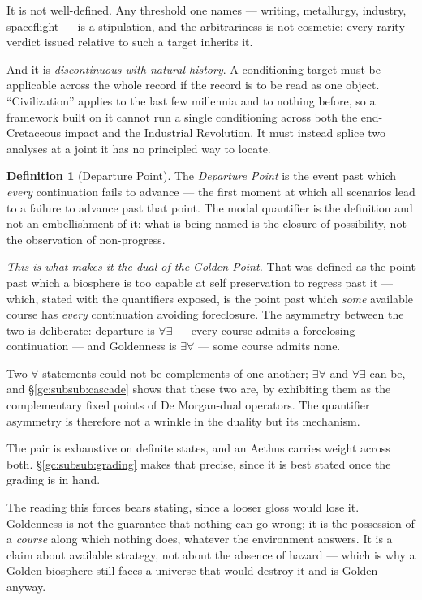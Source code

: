 \documentclass[11pt]{article}
\numberwithin{equation}{section}
\theoremstyle{plain}
\theoremstyle{definition}
\newtheorem{definition}[theorem]{Definition}
\theoremstyle{remark}
\begin{document}
It is not well-defined. Any threshold one names --- writing, metallurgy,
industry, spaceflight --- is a stipulation, and the arbitrariness is not
cosmetic: every rarity verdict issued relative to such a target inherits
it.

And it is \emph{discontinuous with natural history}. A conditioning
target must be applicable across the whole record if the record is to be
read as one object. ``Civilization'' applies to the last few millennia
and to nothing before, so a framework built on it cannot run a single
conditioning across both the end-Cretaceous impact and the Industrial
Revolution. It must instead splice two analyses at a joint it has no
principled way to locate.

\begin{definition}[Departure Point]\label{gc:def:departure}
The \emph{Departure Point} is the event past which \emph{every}
continuation fails to advance --- the first moment at which all
scenarios lead to a failure to advance past that point. The modal
quantifier is the definition and not an embellishment of it: what is
being named is the closure of possibility, not the observation of
non-progress.

\emph{This is what makes it the dual of the Golden Point.} That was
defined as the point past which a biosphere is too capable at self
preservation to regress past it --- which, stated with the quantifiers
exposed, is the point past which \emph{some} available course has
\emph{every} continuation avoiding foreclosure. The asymmetry between
the two is deliberate: departure is $\forall\exists$ --- every course
admits a foreclosing continuation --- and Goldenness is
$\exists\forall$ --- some course admits none.

Two $\forall$-statements could not be complements of one another;
$\exists\forall$ and $\forall\exists$ can be, and
\S\ref{gc:subsub:cascade} shows that these two are, by exhibiting them
as the complementary fixed points of De Morgan-dual operators. The
quantifier asymmetry is therefore not a wrinkle in the duality but its
mechanism.

The pair is exhaustive on definite states, and an Aethus carries weight
across both. \S\ref{gc:subsub:grading} makes that precise, since it is
best stated once the grading is in hand.

The reading this forces bears stating, since a looser gloss
would lose it. Goldenness is not the guarantee that nothing can go
wrong; it is the possession of a \emph{course} along which nothing
does, whatever the environment answers. It is a claim about available
strategy, not about the absence of hazard --- which is why a Golden
biosphere still faces a universe that would destroy it and is Golden
anyway.


\end{definition}
\end{document}
